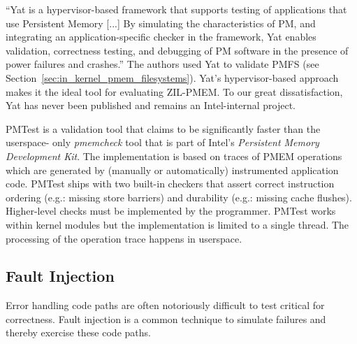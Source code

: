 \documentclass[12pt,a4paper,twoside]{book}
\begin{document}
“Yat is a hypervisor-based framework that supports testing of applications that use Persistent Memory [...]
By simulating the characteristics of PM, and integrating an application-specific checker in the framework, Yat enables validation, correctness testing, and debugging of PM software in the presence of power failures and crashes.”
The authors used Yat to validate PMFS (see Section~\ref{sec:in_kernel_pmem_filesystems}).
Yat's hypervisor-based approach makes it the ideal tool for evaluating ZIL-PMEM.
To our great dissatisfaction, Yat has never been published and remains an Intel-internal project.

PMTest is a validation tool that claims to be significantly faster than the userspace- only \textit{pmemcheck} tool that is part of Intel's \textit{Persistent Memory Development Kit}.
The implementation is based on traces of PMEM operations which are generated by (manually or automatically) instrumented application code.
PMTest ships with two built-in checkers that assert correct instruction ordering (e.g.: missing store barriers) and durability (e.g.: missing cache flushes).
Higher-level checks must be implemented by the programmer.
PMTest works within kernel modules but the implementation is limited to a single thread.
The processing of the operation trace happens in userspace.

\subsection{Fault Injection}\label{sec:rel_work:fault_injection}
Error handling code paths are often notoriously difficult to test critical for correctness.
Fault injection is a common technique to simulate failures and thereby exercise these code paths.
\end{document}
